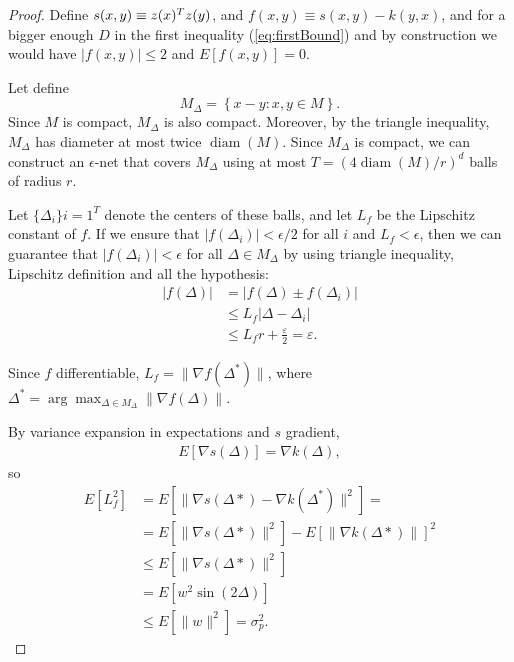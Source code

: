 \begin{proof}
  
Define $s(x,y) \equiv z(x)^T z(y)$, and $f(x,y) \equiv s(x,y) - k(y,x)$, 
and for a bigger enough $D$ in the first inequality (\ref{eq:firstBound}) and by construction  we would have 
$|f(x,y) | \leq 2$ and $E[f(x,y)] = 0$. 


Let define
\begin{equation}
    M_\Delta
    =
    \left\{
    x - y : x,y \in M
    \right\}.
\end{equation}
Since $M$ is compact, $M_\Delta$ is also compact. Moreover, by the triangle inequality, $M_\Delta$ has diameter at most twice $\operatorname{diam}(M)$. Since $M_\Delta$ is compact, we can construct an $\epsilon$-net that covers $M_\Delta$ using at most $T = (4\operatorname{diam}(M)/r)^d$ balls of radius $r$.

Let $\{\Delta_i\}{i=1}^T$ denote the centers of these balls, 
and let $L_f$ be the Lipschitz constant of $f$. 
If we ensure that $|f(\Delta_i)| < \epsilon/2$ for all $i$ and $L_f < \epsilon$, 
then we can guarantee that
 $|f(\Delta_i)| < \epsilon$ for all $\Delta \in M_\Delta$ 
by using triangle inequality, Lipschitz definition and all the hypothesis: 
\begin{align}
    \left|f \left( \Delta\right) \right|
    & =
    \left|
        f \left( \Delta\right) 
        \pm
        f \left( \Delta_i \right) 
    \right|
    \\
    & \leq
    L_f \left| \Delta -  \Delta_i \right|
    \\ & \leq
    L_f r + \frac{\varepsilon}{2} = \varepsilon. 
\end{align}


Since $f$ differentiable, 
$L_f = \|\nabla f(\Delta^*)\|$, where 
$\Delta^* = \arg \max_{\Delta \in M_\Delta} \|\nabla f(\Delta)\|$.

By variance expansion in expectations and $s$ gradient, 
\begin{align}
    E[\nabla s(\Delta)]
    = 
    \nabla k(\Delta),
\end{align}
so 
\begin{align}
    E[L_f^2]
    & =
    E\left[
        \|
        \nabla s(\Delta*)
        -
        \nabla k(\Delta^*)\|^2
    \right]
    = 
    \\
    & = 
    E\left[
        \|
        \nabla s(\Delta*)
       \|^2
    \right]
    -
    E\left[
        \|
        \nabla k(\Delta*)
       \|
    \right]^2
    \\
    &
    \leq 
    E\left[
        \|
        \nabla s(\Delta*)
       \|^2
    \right]
    \\
    &
    =  
    E\left[
        w^2 \sin(2 \Delta)
    \right]
    \\
    &
    \leq 
    E\left[
        \|
        w
       \|^2
    \right]
    = \sigma^2_p.
\end{align}


\end{proof}
